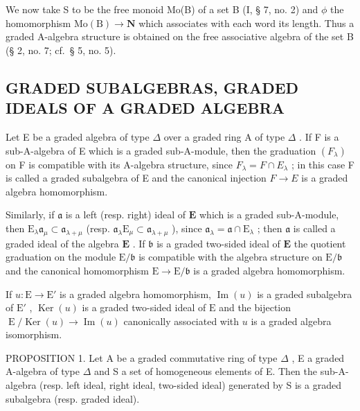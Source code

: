 We now take S to be the free monoid Mo(B) of a set B (I, § 7, no. 2) and \(\phi\) the homomorphism \(\mathrm{Mo(B)} \to \mathbf{N}\) which associates with each word its length. Thus a graded A-algebra structure is obtained on the free associative algebra of the set B (§ 2, no. 7; cf.~§ 5, no. 5).

\subsection{GRADED SUBALGEBRAS, GRADED IDEALS OF A GRADED ALGEBRA}

Let E be a graded algebra of type \(\Delta\) over a graded ring A of type \(\Delta\) . If F is a sub-A-algebra of E which is a graded sub-A-module, then the graduation \((F_{\lambda})\) on F is compatible with its A-algebra structure, since \(F_{\lambda} = F \cap E_{\lambda}\) ; in this case F is called a graded subalgebra of E and the canonical injection \(F \to E\) is a graded algebra homomorphism.

Similarly, if \(\mathfrak{a}\) is a left (resp. right) ideal of \(\mathbf{E}\) which is a graded sub-A-module, then \(\mathrm{E}_{\lambda}\mathfrak{a}_{\mu} \subset \mathfrak{a}_{\lambda + \mu}\) (resp. \(\mathfrak{a}_{\lambda}\mathrm{E}_{\mu} \subset \mathfrak{a}_{\lambda + \mu}\) ), since \(\mathfrak{a}_{\lambda} = \mathfrak{a} \cap \mathrm{E}_{\lambda}\) ; then \(\mathfrak{a}\) is called a graded ideal of the algebra \(\mathbf{E}\) . If \(\mathfrak{b}\) is a graded two-sided ideal of \(\mathbf{E}\) the quotient graduation on the module \(\mathrm{E} / \mathfrak{b}\) is compatible with the algebra structure on \(\mathrm{E} / \mathfrak{b}\) and the canonical homomorphism \(\mathrm{E} \to \mathrm{E} / \mathfrak{b}\) is a graded algebra homomorphism.

If \(u: \mathrm{E} \to \mathrm{E}'\) is a graded algebra homomorphism, \(\operatorname{Im}(u)\) is a graded subalgebra of \(\mathrm{E}'\) , \(\operatorname{Ker}(u)\) is a graded two-sided ideal of \(\mathrm{E}\) and the bijection \(\operatorname{E} / \operatorname{Ker}(u) \to \operatorname{Im}(u)\) canonically associated with \(u\) is a graded algebra isomorphism.

PROPOSITION 1. Let A be a graded commutative ring of type \(\Delta\) , E a graded A-algebra of type \(\Delta\) and S a set of homogeneous elements of E. Then the sub-A-algebra (resp. left ideal, right ideal, two-sided ideal) generated by S is a graded subalgebra (resp. graded ideal).

